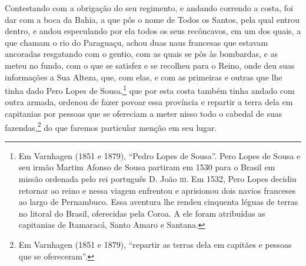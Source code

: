 \begin{linenumbers}
Contestando com a obrigação do seu regimento, e andando correndo a costa, foi dar com a
boca da Bahia, a que pôs o nome de Todos os Santos, pela qual entrou dentro, e andou
especulando por ela todos os seus recôncavos, em um dos quais, a que chamam o rio do
Paraguaçu, achou duas naus francesas que estavam ancoradas resgatando com o gentio, com as
quais se pôs às bombardas, e as meteu no fundo, com o que se satisfez e se recolheu para o
Reino, onde deu suas informações a Sua Alteza, que, com elas, e com as primeiras e outras
que lhe tinha dado Pero Lopes de Sousa,\footnote{ Em Varnhagen (1851 e 1879), ``Pedro
Lopes de Sousa''. Pero Lopes de Sousa e seu irmão Martim Afonso de Sousa partiram em 1530
para o Brasil em missão ordenada pelo rei português D. João \textsc{iii}. Em 1532, Pero
Lopes decidiu retornar ao reino e nessa viagem enfrentou e aprisionou dois navios
franceses ao largo de Pernambuco. Essa aventura lhe rendeu cinquenta léguas de terras no
litoral do Brasil, oferecidas pela Coroa. A ele foram atribuídas as capitanias de
Itamaracá, Santo Amaro e Santana.} que por esta costa também tinha andado com outra
armada, ordenou de fazer povoar essa província e repartir a terra dela em capitanias por
pessoas que se ofereciam a meter nisso todo o cabedal de suas fazendas,\footnote{ Em
Varnhagen (1851 e 1879), ``repartir as terras dela em capitães e pessoas que se
ofereceram''.} do que faremos particular menção em seu lugar.


\end{linenumbers}
